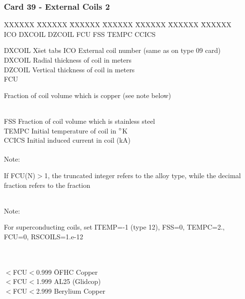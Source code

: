 \newpage \subsubsection{Card 39 - External Coils 2}
\begin{tabbing}
XXXXXX \= XXXXXX \= XXXXXX \= XXXXXX \= XXXXXX \= XXXXXX \=
XXXXXX       \\
\footnotesize  ICO \>\footnotesize DXCOIL  \>\footnotesize DZCOIL \>\footnotesize FCU
\>\footnotesize FSS \>\footnotesize TEMPC \>\footnotesize CCICS \\
\end{tabbing}
\begin{tabbing}
DXCOIL X\= set tabs \kill
ICO \> External coil number (same as on type 09 card)\\
DXCOIL \> Radial thickness of coil in meters\\
DZCOIL \> Vertical thickness of coil in meters\\
FCU \> \parbox[t]{\width}{Fraction of coil volume which is copper (see note below)}\\
FSS \> Fraction of coil volume which is stainless steel\\
TEMPC \> Initial temperature of coil in ${ }^{\footnotesize \circ}$K\\
CCICS \> Initial induced current in coil (kA)\\
 \\
Note: \> \parbox[t]{\width}{If FCU(N)$>$1, the truncated integer refers to the alloy type, while
the decimal fraction refers to the fraction}\\
Note:  \> \parbox[t]{\width}{For superconducting coils,
set ITEMP=-1 (type 12), FSS=0, TEMPC=2., FCU=0, RSCOILS=1.e-12 }\\
 \\
 $<$FCU$<$0.999 \= OFHC Copper\\
$<$FCU$<$1.999 \> AL25 (Glidcop)\\
$<$FCU$<$2.999 \> Berylium Copper
\end{tabbing}

